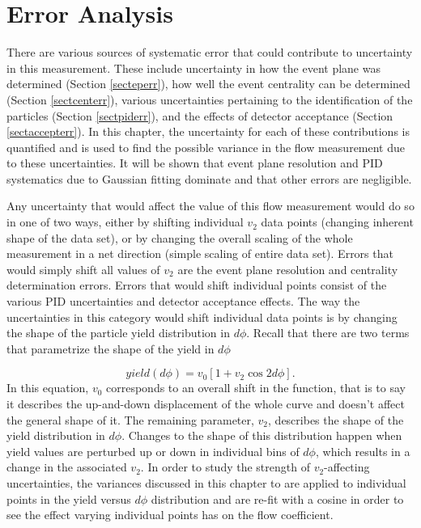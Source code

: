 
\chapter{Error Analysis} %
There are various sources of systematic error that could contribute to uncertainty in this measurement. These include uncertainty in how the event plane was determined (Section \ref{secteperr}), how well the event centrality can be determined (Section \ref{sectcenterr}), various uncertainties pertaining to the identification of the particles (Section \ref{sectpiderr}), and the effects of detector acceptance (Section \ref{sectaccepterr}). In this chapter, the uncertainty for each of these contributions is quantified and is used to find the possible variance in the flow measurement due to these uncertainties. It will be shown that event plane resolution and PID systematics due to Gaussian fitting dominate and that other errors are negligible.

Any uncertainty that would affect the value of this flow measurement would do so in one of two ways, either by shifting individual $v_2$ data points (changing inherent shape of the data set), or by changing the overall scaling of the whole measurement in a net direction (simple scaling of entire data set). Errors that would simply shift all values of $v_2$ are the event plane resolution and centrality determination errors. Errors that would shift individual points consist of the various PID uncertainties and detector acceptance effects. The way the uncertainties in this category would shift individual data points is by changing the shape of the particle yield distribution in $d\phi$. Recall that there are two terms that parametrize the shape of the yield in $d\phi$

\begin{equation}
yield(d\phi) = v_0 [1 + v_2 \cos 2d\phi].
\end{equation}
In this equation, $v_0$ corresponds to an overall shift in the function, that is to say it describes the up-and-down displacement of the whole curve and doesn't affect the general shape of it. The remaining parameter, $v_2$, describes the shape of the yield distribution in $d\phi$. Changes to the shape of this distribution happen when yield values are perturbed up or down in individual bins of $d\phi$, which results in a change in the associated $v_2$. In order to study the strength of $v_2$-affecting uncertainties, the variances discussed in this chapter to are applied to individual points in the yield versus $d\phi$ distribution and are re-fit with a cosine in order to see the effect varying individual points has on the flow coefficient. 

